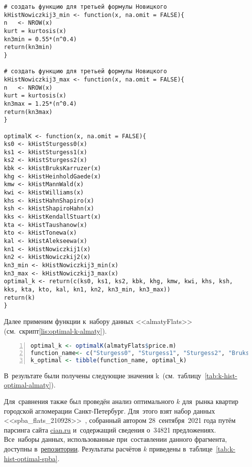 \documentclass[]{scrartcl}
\begin{document}
\begin{lstlisting}
# создать функцию для третьей формулы Новицкого
kHistNowiczkij3_min <- function(x, na.omit = FALSE){ 
n   <- NROW(x)                                     
kurt = kurtosis(x)                                 
kn3min = 0.55*(n^0.4)                             
return(kn3min)                                    
}                                                   

# создать функцию для третьей формулы Новицкого
kHistNowiczkij3_max <- function(x, na.omit = FALSE){
n   <- NROW(x)                                   
kurt = kurtosis(x)                                
kn3max = 1.25*(n^0.4)                             
return(kn3max)                                    
}                                                   

optimalK <- function(x, na.omit = FALSE){ 
ks0 <- kHistSturgess0(x)
ks1 <- kHistSturgess1(x)
ks2 <- kHistSturgess2(x)
kbk <- kHistBruksKarruzer(x)
khg <- kHistHeinholdGaede(x)
kmw <- kHistMannWald(x)
kwi <- kHistWilliams(x)
khs <- kHistHahnShapiro(x) 
ksh <- kHistShapiroHahn(x)
kks <- kHistKendallStuart(x)
kta <- kHistTaushanow(x)
kto <- kHistTonewa(x)
kal <- kHistAlekseewa(x)
kn1 <- kHistNowiczkij1(x)
kn2 <- kHistNowiczkij2(x)
kn3_min <- kHistNowiczkij3_min(x)
kn3_max <- kHistNowiczkij3_max(x)
optimal_k <- return(c(ks0, ks1, ks2, kbk, khg, kmw, kwi, khs, ksh, kks, kta, kto, kal, kn1, kn2, kn3_min, kn3_max))
return(k)
}
\end{lstlisting}

Далее применим функции к~набору данных <<almatyFlats>> (см.~скрипт\ref{lis:optimal-k-almaty}).
\begin{lstlisting}[float, caption = Создание функций для~автоматизированного определения оптимального значения k, firstnumber=1, language = R, firstnumber=1, numbers=left, numberstyle=\tiny, stepnumber=2, numbersep=5pt, label= lis:optimal-k-almaty]
optimal_k <- optimalK(almatyFlats$price.m)  
function_name<- c("Sturgess0", "Sturgess1", "Sturgess2", "BruksKarruzer", "HeinholdGaede", "MannWald", "Williams", "HahnShapiro", "ShapiroHahn", "KendallStuart", "Taushanow", "Tonewa", "Alekseewa", "Nowiczkij1", "Nowiczkij2", "Nowiczkij3_min", "Nowiczkij3_max")
k_optimal <- tibble(function_name, optimal_k)
\end{lstlisting}

 В~результате были получены следующие значения k~(см.~таблицу~\ref{tab:k-hist-optimal-almaty}).
 
 Для~сравнения также был проведён анализ оптимального $k$ для~рынка квартир городской агломерации Санкт-Петербург. Для~этого взят набор данных <<spba\_flats\_210928>>~\cite{ds:spba_flats_210928}, собранный автором 28~сентября~2021 года путём парсинга сайта \href{cian.ru}{cian.ru} и~содержащий сведения о~34821 предложениях. Все~наборы данных, использованные при~составлении данного фрагмента, доступны в~\href{https://github.com/Kirill-Murashev/datasets}{репозитории}. Результаты расчётов $k$ приведены в~таблице~\ref{tab:k-hist-optimal-spba}.
\end{document}
